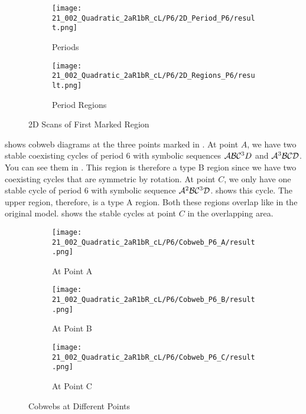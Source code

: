 \begin{figure}
    \centering
    \begin{subfigure}{0.4\textwidth}
        \centering
        \texttt{[image: 21\_002\_Quadratic\_2aR1bR\_cL/P6/2D\_Period\_P6/result.png]}
        \caption{Periods}
        \label{fig:quadratic.full.2aR1bR_cL.2d.1}
    \end{subfigure}
    \begin{subfigure}{0.4\textwidth}
        \centering
        \texttt{[image: 21\_002\_Quadratic\_2aR1bR\_cL/P6/2D\_Regions\_P6/result.png]}
        \caption{Period Regions}
        \label{fig:quadratic.regions.2aR1bR_cL.2d.1}
    \end{subfigure}
    \caption{2D Scans of First Marked Region}
\end{figure}

 shows cobweb diagrams at the three points marked in .
At point $A$, we have two stable coexisting cycles of period 6 with symbolic sequences $\mathcal{A}\mathcal{B}\mathcal{C}^3D$ and $\mathcal{A}^3\mathcal{B}\mathcal{C}\mathcal{D}$.
You can see them in .
This region is therefore a type B region since we have two coexisting cycles that are symmetric by rotation.
At point $C$, we only have one stable cycle of period 6 with symbolic sequence $\mathcal{A}^2\mathcal{B}\mathcal{C}^3\mathcal{D}$.
 shows this cycle.
The upper region, therefore, is a type A region.
Both these regions overlap like in the original model.
 shows the stable cycles at point $C$ in the overlapping area.

\begin{figure}
    \centering
    \begin{subfigure}{0.3\textwidth}
        \centering
        \texttt{[image: 21\_002\_Quadratic\_2aR1bR\_cL/P6/Cobweb\_P6\_A/result.png]}
        \caption{At Point A}
        \label{fig:quad.full.2aR1bR_cL.1.CobwebA}
    \end{subfigure}
    \begin{subfigure}{0.3\textwidth}
        \centering
        \texttt{[image: 21\_002\_Quadratic\_2aR1bR\_cL/P6/Cobweb\_P6\_B/result.png]}
        \caption{At Point B}
        \label{fig:quad.full.2aR1bR_cL.1.CobwebB}
    \end{subfigure}
    \begin{subfigure}{0.3\textwidth}
        \centering
        \texttt{[image: 21\_002\_Quadratic\_2aR1bR\_cL/P6/Cobweb\_P6\_C/result.png]}
        \caption{At Point C}
        \label{fig:quad.full.2aR1bR_cL.1.CobwebC}
    \end{subfigure}
    \caption{Cobwebs at Different Points}
    \label{fig:quad.full.2aR1bR_cL.1.Cobwebs}
\end{figure}

